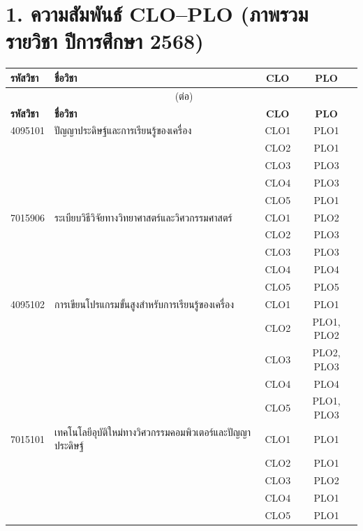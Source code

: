 \documentclass[12pt,a4paper]{article}
\begin{document}
\section*{1. ความสัมพันธ์ CLO--PLO (ภาพรวมรายวิชา ปีการศึกษา 2568)}
\begin{longtable}{|l|p{6.5cm}|c|c|}
\hline
\rowcolor{hdr}\color{white}\textbf{รหัสวิชา} & \color{white}\textbf{ชื่อวิชา} & \color{white}\textbf{CLO} & \color{white}\textbf{PLO} \\ \hline
\endfirsthead \multicolumn{4}{c}{\tablename\ (ต่อ)} \\ \hline
\rowcolor{hdr}\color{white}\textbf{รหัสวิชา} & \color{white}\textbf{ชื่อวิชา} & \color{white}\textbf{CLO} & \color{white}\textbf{PLO} \\ \hline \endhead
  4095101 & ปัญญาประดิษฐ์และการเรียนรู้ของเครื่อง & CLO1 & PLO1 \\
   &  & CLO2 & PLO1 \\
   &  & CLO3 & PLO3 \\
   &  & CLO4 & PLO3 \\
   &  & CLO5 & PLO1 \\
  \hline
  7015906 & ระเบียบวิธีวิจัยทางวิทยาศาสตร์และวิศวกรรมศาสตร์ & CLO1 & PLO2 \\
   &  & CLO2 & PLO3 \\
   &  & CLO3 & PLO3 \\
   &  & CLO4 & PLO4 \\
   &  & CLO5 & PLO5 \\
  \hline
  4095102 & การเขียนโปรแกรมขั้นสูงสำหรับการเรียนรู้ของเครื่อง & CLO1 & PLO1 \\
   &  & CLO2 & PLO1, PLO2 \\
   &  & CLO3 & PLO2, PLO3 \\
   &  & CLO4 & PLO4 \\
   &  & CLO5 & PLO1, PLO3 \\
  \hline
  7015101 & เทคโนโลยีอุบัติใหม่ทางวิศวกรรมคอมพิวเตอร์และปัญญาประดิษฐ์ & CLO1 & PLO1 \\
   &  & CLO2 & PLO1 \\
   &  & CLO3 & PLO2 \\
   &  & CLO4 & PLO1 \\
   &  & CLO5 & PLO1 \\
  \hline
\end{longtable}
\end{document}
